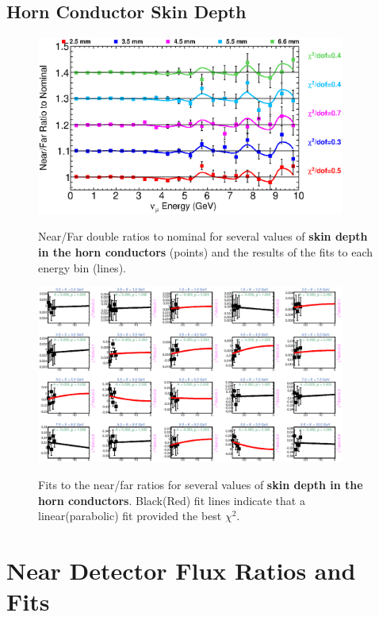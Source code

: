 \clearpage
\subsection{Horn Conductor Skin Depth}

\begin{figure}[ht]
  \begin{center}
    {\includegraphics[width=4.0in]{figures/SkinDepthIC__nof_summary.eps}}
  \end{center}
\caption{ Near/Far double ratios to nominal for several values of {\bf skin depth in the horn conductors} (points) and the results of the fits to each energy bin (lines).}
\end{figure}

\begin{figure}[hb]
  \begin{center}
    {\includegraphics[width=4.0in]{figures/SkinDepthIC__nof_fits.eps}}
  \end{center}
\caption{ Fits to the near/far ratios for several values of {\bf skin depth in the horn conductors}. Black(Red) fit lines indicate that a linear(parabolic) fit provided the best $\chi^2$. }
\end{figure}

\section{Near Detector Flux Ratios and Fits}
\label{app:near_plots}

